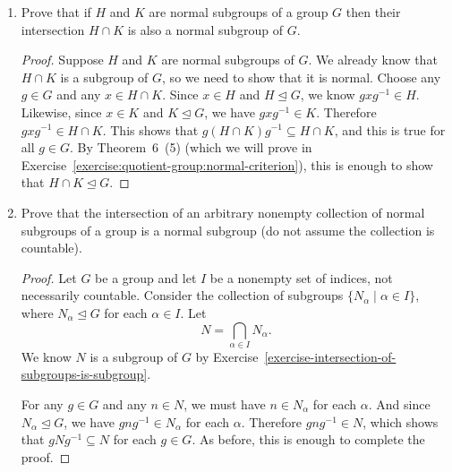 \begin{enumerate}
\item Prove that if $H$ and $K$ are normal subgroups of a group $G$
  then their intersection $H\cap K$ is also a normal subgroup of $G$.
  \begin{proof}
    Suppose $H$ and $K$ are normal subgroups of $G$. We already know
    that $H\cap K$ is a subgroup of $G$, so we need to show that it is
    normal. Choose any $g\in G$ and any $x\in H\cap K$. Since $x\in H$
    and $H\trianglelefteq G$, we know $gxg^{-1}\in H$. Likewise, since
    $x\in K$ and $K\trianglelefteq G$, we have $gxg^{-1}\in
    K$. Therefore $gxg^{-1}\in H\cap K$. This shows that
    $g(H\cap K)g^{-1}\subseteq H\cap K$, and this is true for all
    $g\in G$. By Theorem~6~(5) (which we will prove in
    Exercise~\ref{exercise:quotient-group:normal-criterion}), this is
    enough to show that $H\cap K\trianglelefteq G$.
  \end{proof}
\item Prove that the intersection of an arbitrary nonempty collection
  of normal subgroups of a group is a normal subgroup (do not assume
  the collection is countable).
  \begin{proof}
    Let $G$ be a group and let $I$ be a nonempty set of indices, not
    necessarily countable. Consider the collection of subgroups
    $\{N_\alpha \mid \alpha\in I\}$, where $N_\alpha\trianglelefteq G$
    for each $\alpha\in I$. Let
    \begin{equation*}
      N = \bigcap_{\alpha\in I}N_\alpha.
    \end{equation*}
    We know $N$ is a subgroup of $G$ by
    Exercise~\ref{exercise-intersection-of-subgroups-is-subgroup}.

    For any $g\in G$ and any $n\in N$, we must have $n\in N_\alpha$
    for each $\alpha$. And since $N_\alpha\trianglelefteq G$, we have
    $gng^{-1}\in N_\alpha$ for each $\alpha$. Therefore
    $gng^{-1}\in N$, which shows that $gNg^{-1}\subseteq N$ for each
    $g\in G$. As before, this is enough to complete the proof.
  \end{proof}
\end{enumerate}

